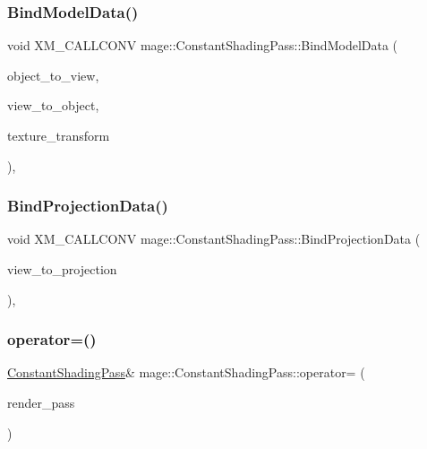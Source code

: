 \subsubsection{\texorpdfstring{Bind\+Model\+Data()}{BindModelData()}}
{\footnotesize\ttfamily void X\+M\+\_\+\+C\+A\+L\+L\+C\+O\+NV mage\+::\+Constant\+Shading\+Pass\+::\+Bind\+Model\+Data (\begin{DoxyParamCaption}\item[{F\+X\+M\+M\+A\+T\+R\+IX}]{object\+\_\+to\+\_\+view,  }\item[{F\+X\+M\+M\+A\+T\+R\+IX}]{view\+\_\+to\+\_\+object,  }\item[{F\+X\+M\+M\+A\+T\+R\+IX}]{texture\+\_\+transform }\end{DoxyParamCaption})\hspace{0.3cm}{\ttfamily [private]}, {\ttfamily [noexcept]}}

\hypertarget{classmage_1_1_constant_shading_pass_ab4c59f54c89a3672530531de1923b3d7}{}\label{classmage_1_1_constant_shading_pass_ab4c59f54c89a3672530531de1923b3d7} 
\subsubsection{\texorpdfstring{Bind\+Projection\+Data()}{BindProjectionData()}}
{\footnotesize\ttfamily void X\+M\+\_\+\+C\+A\+L\+L\+C\+O\+NV mage\+::\+Constant\+Shading\+Pass\+::\+Bind\+Projection\+Data (\begin{DoxyParamCaption}\item[{F\+X\+M\+M\+A\+T\+R\+IX}]{view\+\_\+to\+\_\+projection }\end{DoxyParamCaption})\hspace{0.3cm}{\ttfamily [private]}, {\ttfamily [noexcept]}}

\hypertarget{classmage_1_1_constant_shading_pass_ada08b06e66c1d1da2f869b96b71f3202}{}\label{classmage_1_1_constant_shading_pass_ada08b06e66c1d1da2f869b96b71f3202} 
\subsubsection{\texorpdfstring{operator=()}{operator=()}\hspace{0.1cm}{\footnotesize\ttfamily [1/2]}}
{\footnotesize\ttfamily \hyperlink{classmage_1_1_constant_shading_pass}{Constant\+Shading\+Pass}\& mage\+::\+Constant\+Shading\+Pass\+::operator= (\begin{DoxyParamCaption}\item[{const \hyperlink{classmage_1_1_constant_shading_pass}{Constant\+Shading\+Pass} \&}]{render\+\_\+pass }\end{DoxyParamCaption})\hspace{0.3cm}{\ttfamily [delete]}}

